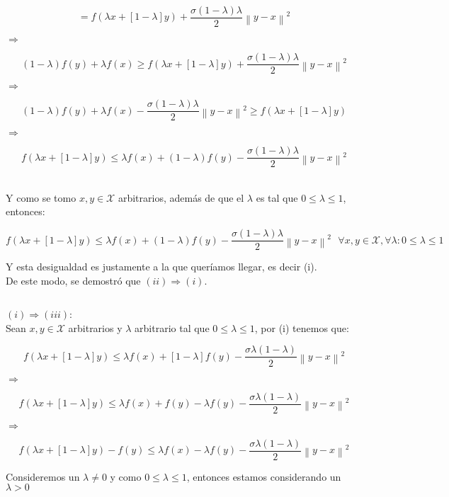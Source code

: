 \documentclass[11pt]{article}
\begin{document}
\[ = f(\lambda x + [1-\lambda] y) +   \frac{\sigma (1-\lambda)\lambda }{2} \left\| y-x \right\|^{2} \] 

$ \Rightarrow $ 

\[ (1-\lambda)f(y) + \lambda f(x) \geq f(\lambda x + [1-\lambda] y) +   \frac{\sigma (1-\lambda)\lambda }{2} \left\| y-x \right\|^{2} \]

$ \Rightarrow $ 

\[ (1-\lambda)f(y) + \lambda f(x) - \frac{\sigma (1-\lambda)\lambda }{2} \left\| y-x \right\|^{2} \geq f(\lambda x + [1-\lambda] y)    \]

$ \Rightarrow $ 

\[ f(\lambda x + [1-\lambda] y) \leq \lambda f(x) + (1-\lambda)f(y) - \frac{\sigma (1-\lambda)\lambda }{2} \left\| y-x \right\|^{2}  \] \

Y como se tomo $ x,y \in \mathcal{X} $ arbitrarios, además de que el $ \lambda $ es tal que $ 0 \leq \lambda \leq 1 $, entonces:

\[ f(\lambda x + [1-\lambda] y) \leq \lambda f(x) + (1-\lambda)f(y) - \frac{\sigma (1-\lambda)\lambda }{2} \left\| y-x \right\|^{2} \ \ \ \forall x,y \in \mathcal{X}, \forall \lambda: 0 \leq \lambda \leq 1  \]

Y esta desigualdad es justamente a la que queríamos llegar, es decir (i). \\

De este modo, se demostró que $ \boxed{(ii)  \Rightarrow  (i)} $. \

\hrulefill

$ \ $ 

\underline{$(i) \Rightarrow (iii) $}: \\

Sean $ x,y \in \mathcal{X} $ arbitrarios y $ \lambda $ arbitrario tal que $ 0 \leq \lambda \leq 1 $, por (i) tenemos que: 

\[ f(\lambda x + [1-\lambda] y ) \leq \lambda f(x) + [1-\lambda] f(y) - \frac{\sigma \lambda (1-\lambda)}{2} \left\| y-x \right\|^{2}  \]

$ \Rightarrow $ 

\[ f(\lambda x + [1-\lambda] y ) \leq \lambda f(x) + f(y) - \lambda f(y) - \frac{\sigma \lambda (1-\lambda)}{2} \left\| y-x \right\|^{2}  \]

$ \Rightarrow $ 

\[ f(\lambda x + [1-\lambda] y ) - f(y) \leq \lambda f(x)  - \lambda f(y) - \frac{\sigma \lambda (1-\lambda)}{2} \left\| y-x \right\|^{2}  \]

Consideremos un $ \lambda \neq 0 $ y como $ 0 \leq \lambda \leq 1 $, entonces estamos considerando un $ \lambda > 0 $ \\
\end{document}
